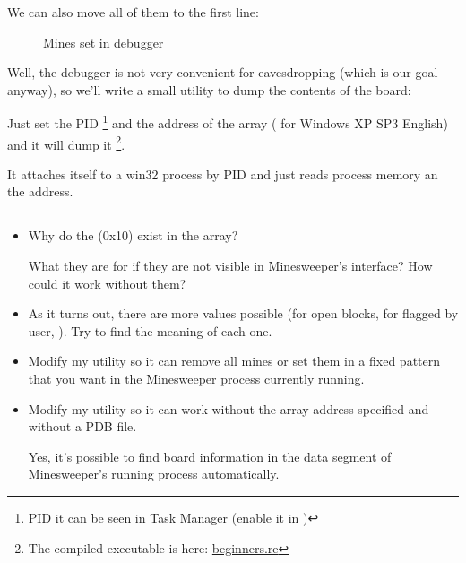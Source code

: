 We can also move all of them to the first line: 

\begin{figure}[H]
\centering
{}
\caption{Mines set in debugger}
\label{fig:minesweeper2}
\end{figure}

Well, the debugger is not very convenient for eavesdropping (which is our goal anyway), so we'll write a small utility
to dump the contents of the board:



Just set the \ac{PID}
\footnote{PID it can be seen in Task Manager 
(enable it in )} 
and the address of the array ( for Windows XP SP3 English) 
and it will dump it
\footnote{The compiled executable is here: 
\href{http://go.yurichev.com/17165}{beginners.re}}.

It attaches itself to a win32 process by \ac{PID} and just reads process memory an the address.

\subsection{\Exercises}

\begin{itemize}

\item 
Why do the  (0x10) exist in the array?

What they are for if they are not visible in Minesweeper's interface?
How could it work without them?

\item 
As it turns out, there are more values possible (for open blocks, for flagged by user, \etc{}).
Try to find the meaning of each one.

\item 
Modify my utility so it can remove all mines or set them in a fixed pattern that you want in the Minesweeper
process currently running.

\item 
Modify my utility so it can work without the array address specified and without a \gls{PDB} file.

Yes, it's possible to find board information in the data segment of Minesweeper's running process automatically.

\end{itemize}
